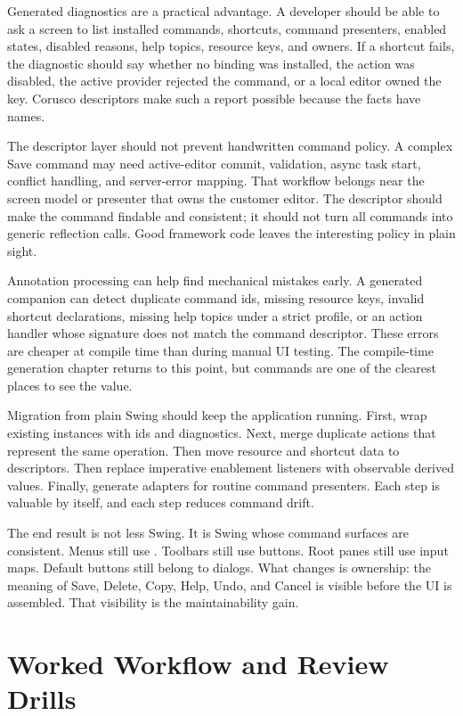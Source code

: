Generated diagnostics are a practical advantage. A developer should be able to
ask a screen to list installed commands, shortcuts, command presenters, enabled states,
disabled reasons, help topics, resource keys, and owners. If a shortcut fails,
the diagnostic should say whether no binding was installed, the action was
disabled, the active provider rejected the command, or a local editor owned the
key. Corusco descriptors make such a report possible because the facts have
names.

The descriptor layer should not prevent handwritten command policy. A complex
Save command may need active-editor commit, validation, async task start,
conflict handling, and server-error mapping. That workflow belongs near the
screen model or presenter that owns the customer editor. The descriptor should
make the command findable and consistent; it should not turn all commands into
generic reflection calls. Good framework code leaves the interesting policy in
plain sight.

Annotation processing can help find mechanical mistakes early. A generated
companion can detect duplicate command ids, missing resource keys, invalid
shortcut declarations, missing help topics under a strict profile, or an action
handler whose signature does not match the command descriptor. These errors are
cheaper at compile time than during manual UI testing. The compile-time
generation chapter returns to this point, but commands are one of the clearest
places to see the value.

Migration from plain Swing should keep the application running. First, wrap
existing  instances with ids and diagnostics. Next, merge duplicate
actions that represent the same operation. Then move resource and shortcut data
to descriptors. Then replace imperative enablement listeners with observable
derived values. Finally, generate adapters for routine command presenters. Each step is
valuable by itself, and each step reduces command drift.

The end result is not less Swing. It is Swing whose command surfaces are
consistent. Menus still use . Toolbars still use buttons.
Root panes still use input maps. Default buttons still belong to dialogs. What
changes is ownership: the meaning of Save, Delete, Copy, Help, Undo, and Cancel
is visible before the UI is assembled. That visibility is the maintainability
gain.

\section{Worked Workflow and Review Drills}

